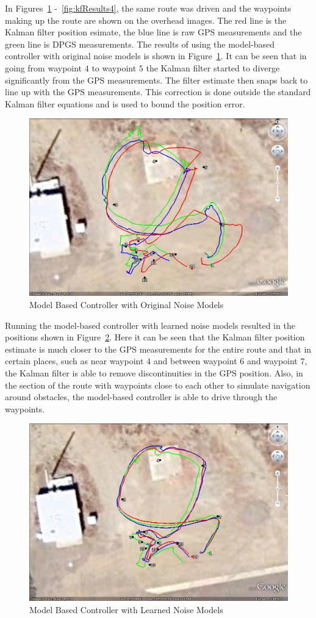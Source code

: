In Figures~\ref{fig:kfResults1} -~\ref{fig:kfResults4}, the same route was driven and the waypoints making up the route are shown on the overhead images. The red line is the Kalman filter position esimate, the blue line is raw GPS measurements and the green line is DPGS measurements. The results of using the model-based controller with original noise models is shown in Figure~\ref{fig:kfResults1}. It can be seen that in going from waypoint $4$ to waypoint $5$ the Kalman filter started to diverge significantly from the GPS measurements. The filter estimate then snaps back to line up with the GPS measurements. This correction is done outside the standard Kalman filter equations and is used to bound the position error.

\begin{figure}[ht!]
\centering
\includegraphics[width=.75\textwidth]{images/GE/20101203_1551_kf_lyapOrigQR}
\caption{Model Based Controller with Original Noise Models}
\label{fig:kfResults1}
\end{figure}

Running the model-based controller with learned noise models resulted in the positions shown in Figure~\ref{fig:kfResults2}. Here it can be seen that the Kalman filter position estimate is much closer to the GPS measurements for the entire route and that in certain places, such as near waypoint $4$ and between waypoint $6$ and waypoint $7$, the Kalman filter is able to remove discontinuities in the GPS position. Also, in the section of the route with waypoints close to each other to simulate navigation around obstacles, the model-based controller is able to drive through the waypoints.

\begin{figure}[ht!]
\centering
\includegraphics[width=.75\textwidth]{images/GE/20101203_1545_kf_lyapNewQR}
\caption{Model Based Controller with Learned Noise Models}
\label{fig:kfResults2}
\end{figure}

